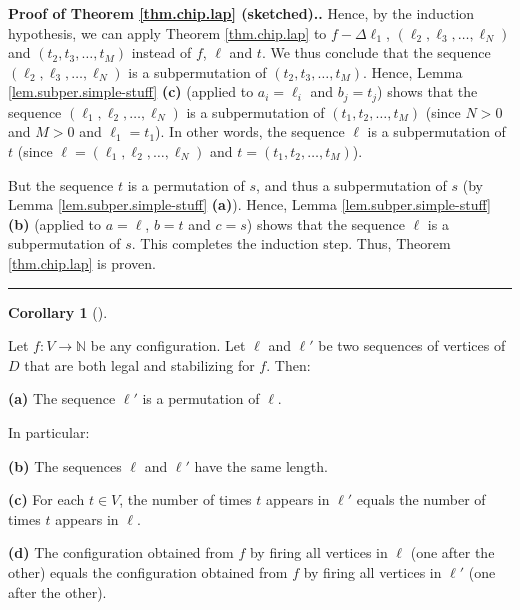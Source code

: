 \documentclass[numbers=enddot,12pt,final,onecolumn,notitlepage]{scrartcl}%
\theoremstyle{definition}
\newtheorem{coro}[theo]{Corollary}
\newenvironment{corollary}[1][]
{\begin{coro}[#1]\begin{leftbar}}
{\end{leftbar}\end{coro}}
\newenvironment{proof}[1][Proof]{\noindent\textbf{#1.} }{\ \rule{0.5em}{0.5em}}
\newcommand{\NN}{\mathbb{N}}
\begin{document}
\begin{proof}[Proof of Theorem \ref{thm.chip.lap} (sketched).]
Hence, by the induction hypothesis, we can apply Theorem \ref{thm.chip.lap} to
$f-\Delta\ell_{1}$, $\left(  \ell_{2},\ell_{3},\ldots,\ell_{N}\right)  $ and
$\left(  t_{2},t_{3},\ldots,t_{M}\right)  $ instead of $f$, $\ell$ and $t$. We
thus conclude that the sequence $\left(  \ell_{2},\ell_{3},\ldots,\ell
_{N}\right)  $ is a subpermutation of $\left(  t_{2},t_{3},\ldots
,t_{M}\right)  $. Hence, Lemma \ref{lem.subper.simple-stuff} \textbf{(c)}
(applied to $a_{i}=\ell_{i}$ and $b_{j}=t_{j}$) shows that the sequence
$\left(  \ell_{1},\ell_{2},\ldots,\ell_{N}\right)  $ is a subpermutation of
$\left(  t_{1},t_{2},\ldots,t_{M}\right)  $ (since $N>0$ and $M>0$ and
$\ell_{1}=t_{1}$). In other words, the sequence $\ell$ is a subpermutation of
$t$ (since $\ell=\left(  \ell_{1},\ell_{2},\ldots,\ell_{N}\right)  $ and
$t=\left(  t_{1},t_{2},\ldots,t_{M}\right)  $).

But the sequence $t$ is a permutation of $s$, and thus a subpermutation of $s$
(by Lemma \ref{lem.subper.simple-stuff} \textbf{(a)}). Hence, Lemma
\ref{lem.subper.simple-stuff} \textbf{(b)} (applied to $a=\ell$, $b=t$ and
$c=s$) shows that the sequence $\ell$ is a subpermutation of $s$. This
completes the induction step. Thus, Theorem \ref{thm.chip.lap} is proven.
\end{proof}

\begin{corollary} \label{cor.chip.lap-cor}
Let $f : V \to \NN$ be any configuration.
Let $\ell$ and $\ell'$ be two sequences of vertices of $D$
that are both legal and stabilizing for $f$.
Then:

\textbf{(a)} The sequence $\ell'$ is a permutation of $\ell$.

In particular:

\textbf{(b)} The sequences $\ell$ and $\ell'$ have the
same length.

\textbf{(c)} For each $t \in V$, the number of times $t$
appears in $\ell'$ equals the number of times $t$ appears in
$\ell$.

\textbf{(d)} The configuration obtained from $f$ by firing
all vertices in $\ell$ (one after the other) equals the
configuration obtained from $f$ by firing
all vertices in $\ell'$ (one after the other).
\end{corollary}
\end{document}
